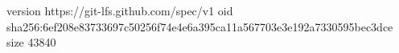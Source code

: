 version https://git-lfs.github.com/spec/v1
oid sha256:6ef208e83733697c50256f74e4e6a395ca11a567703e3e192a7330595bec3dce
size 43840
